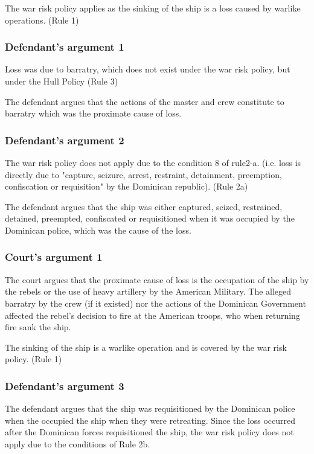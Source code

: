 The war risk policy applies as the sinking of the ship is a loss caused by warlike operations. (Rule 1)

\subsubsection{Defendant's argument 1}

Loss was due to barratry, which does not exist under the war risk policy, but under the Hull Policy (Rule 3)
    
The defendant argues that the actions of the master and crew constitute to barratry which was the proximate cause of loss.

\subsubsection{Defendant's argument 2}

The war risk policy does not apply due to the condition 8 of rule2-a. (i.e. loss is directly due to "capture, seizure, arrest, restraint, detainment, preemption, confiscation or requisition" by the Dominican republic). (Rule 2a)

The defendant argues that the ship was either captured, seized, restrained, detained, preempted, confiscated or requisitioned when it was occupied by the Dominican police, which was the cause of the loss.

\subsubsection{Court's argument 1}

The court argues that the proximate cause of loss is the occupation of the ship by the rebels or the use of heavy artillery by the American Military. The alleged barratry by the crew (if it existed) nor the actions of the Dominican Government affected the rebel's decision to fire at the American troops, who when returning fire sank the ship.

The sinking of the ship is a warlike operation and is covered by the war risk policy. (Rule 1)

\subsubsection{Defendant's argument 3}

The defendant argues that the ship was requisitioned by the Dominican police when the occupied the ship when they were retreating. Since the loss occurred after the Dominican forces requisitioned the ship, the war risk policy does not apply due to the conditions of Rule 2b.

